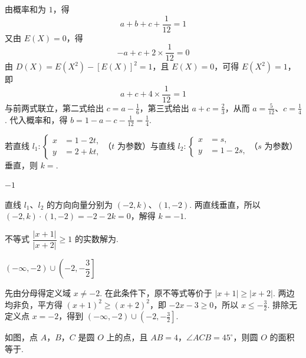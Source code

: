 \begin{solution}
由概率和为 \(1\)，得
\[
a+b+c+\dfrac1{12}=1
\]
又由 \(E(X)=0\)，得
\[
-a+c+2\times\dfrac1{12}=0
\]
由 \(D(X)=E(X^2)-[E(X)]^2=1\)，且 \(E(X)=0\)，可得 \(E(X^2)=1\)，即
\[
a+c+4\times\dfrac1{12}=1
\]
与前两式联立，第二式给出 \(c=a-\frac16\)，第三式给出 \(a+c=\frac23\)，从而 \(a=\frac5{12}\)、\(c=\frac14\). 代入概率和，得 \(b=1-a-c-\frac1{12}=\frac14\).
\end{solution}

\begin{problem}
若直线 \(l_1:\begin{cases}
x&=1-2t,\\
y&=2+kt,
\end{cases}\)（\(t\) 为参数）与直线 \(l_2:\begin{cases}
x&=s,\\
y&=1-2s,
\end{cases}\)（\(s\) 为参数）垂直，则 \(k = \)\fillinblank{}.
\end{problem}

\begin{answer}
\(-1\)
\end{answer}

\begin{solution}
直线 \(l_1\)、\(l_2\) 的方向向量分别为 \((-2,k)\)、\((1,-2)\). 两直线垂直，所以 \((-2,k)\cdot(1,-2)=-2-2k=0\)，解得 \(k=-1\).
\end{solution}

\begin{problem}
不等式 \(\dfrac{|x+1|}{|x+2|}\geqslant 1\) 的实数解为\fillinblank{}.
\end{problem}

\begin{answer}
\((-\infty,-2)\cup\left(-2,-\dfrac{3}{2}\right]\)
\end{answer}

\begin{solution}
先由分母得定义域 \(x\neq-2\). 在此条件下，原不等式等价于 \(|x+1|\geqslant|x+2|\). 两边均非负，平方得 \((x+1)^2\geqslant(x+2)^2\)，即 \(-2x-3\geqslant0\)，所以 \(x\leqslant-\frac32\). 排除无定义点 \(x=-2\)，得到 \((-\infty,-2)\cup\left(-2,-\frac32\right]\).
\end{solution}

\begin{problem}
如图，点 \(A\)，\(B\)，\(C\) 是圆 \(O\) 上的点，且 \(AB = 4\)，\(\angle ACB = 45^{\circ}\)，则圆 \(O\) 的面积等于\fillinblank{}.

\end{problem}

